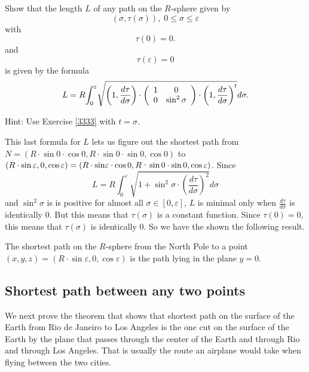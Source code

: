 \documentclass{ximera}
\begin{document}
\begin{exercise}
 Show that the length $L$ of any path on the $R$-sphere given by%
\[
\left(  \sigma,\tau\left(  \sigma\right)  \right)  ,\;0\leq\sigma
\leq\varepsilon
\]
with%
\[
\tau\left(  0\right)  =0.
\]
and%
\[
\tau\left(  \varepsilon\right)  =0
\]
is given by the formula%
\[
L=R%
{\displaystyle\int\nolimits_{0}^{\varepsilon}}
\sqrt{\left(  1,\frac{d\tau}{d\sigma}\right)  \cdot\left(
\begin{array}
[c]{cc}%
1 & 0\\
0 & \sin^{2}\sigma
\end{array}
\right)  \cdot\left(  1,\frac{d\tau}{d\sigma}\right)  ^{t}}d\sigma.
\]


Hint: Use Exercise \ref{3333} with $t=\sigma$.
\end{exercise}

This last formula for $L$ lets us figure out the shortest path from $N=\left(
R\cdot \sin 0\cdot %
\cos 0,R\cdot \sin %
0\cdot \sin 0,\cos 0\right)  $ to $\left(
R\cdot \sin \varepsilon,0,\cos %
\varepsilon\right)  =\left(  R\cdot \mathrm{sin\varepsilon
}\cdot \cos 0,R\text{\textperiodcentered
}\sin 0\cdot \sin 0,\cos %
\varepsilon\right)  $. Since%
\[
L=R%
{\displaystyle\int\nolimits_{0}^{\varepsilon}}
\sqrt{1+\sin ^{2}\sigma\cdot \left(  \frac{d\tau
}{d\sigma}\right)  ^{2}}d\sigma
\]
and $\sin ^{2}\sigma$ is is positive for almost all $\sigma\in\left[
0,\varepsilon\right]  $, $L$ is minimal only when $\frac{d\tau}{d\sigma}$ is
identically $0$. But this means that $\tau\left(  \sigma\right)  $ is a
constant function. Since $\tau\left(  0\right)  =0$, this means that
$\tau\left(  \sigma\right)  $ is identically $0$. So we have the shown the
following result.

\begin{theorem}
The shortest path on the $R$-sphere from the North Pole to a
point $\left(  x,y,z\right)  =\left(  R\cdot %
\sin \varepsilon,0,\cos \varepsilon\right)  $ is the path lying
in the plane $y=0$.
\end{theorem}



\subsection*{Shortest path between any two points}

We next prove the theorem that shows that shortest path on the surface of the
Earth from Rio de Janeiro to Los Angeles is the one cut on the surface of the
Earth by the plane that passes through the center of the Earth and through Rio
and through Los Angeles. That is usually the route an airplane would take when
flying between the two cities.
\end{document}
